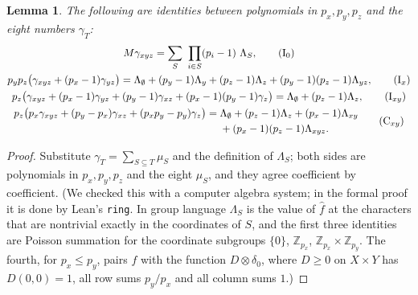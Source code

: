 \documentclass[11pt,a4paper]{amsart}
\newtheorem{lemma}[theorem]{Lemma}
\theoremstyle{definition}
\theoremstyle{remark}
\newcommand{\Z}{\mathbb{Z}}
\begin{document}
\begin{lemma}\label{lem:ident}
The following are identities between polynomials in $p_x,p_y,p_z$ and the eight numbers $\gamma_T$:
\begin{gather*}
 M\gamma_{xyz}=\sum_{S}\ \prod_{i\in S}(p_i-1)\ \Lambda_S, \tag{I$_0$}\\
 p_yp_z\bigl(\gamma_{xyz}+(p_x-1)\gamma_{yz}\bigr)=\Lambda_\emptyset+(p_y-1)\Lambda_y+(p_z-1)\Lambda_z
   +(p_y-1)(p_z-1)\Lambda_{yz}, \tag{I$_x$}\\
 p_z\bigl(\gamma_{xyz}+(p_x-1)\gamma_{yz}+(p_y-1)\gamma_{xz}+(p_x-1)(p_y-1)\gamma_{z}\bigr)
   =\Lambda_\emptyset+(p_z-1)\Lambda_z, \tag{I$_{xy}$}\\
 \begin{aligned}
 p_z\bigl(p_x\gamma_{xyz}+(p_y-p_x)\gamma_{xz}+(p_xp_y-p_y)\gamma_{z}\bigr)
   ={}&\Lambda_\emptyset+(p_z-1)\Lambda_z+(p_x-1)\Lambda_{xy}\\
   &{}+(p_x-1)(p_z-1)\Lambda_{xyz}.
 \end{aligned} \tag{C$_{xy}$}
\end{gather*}
\end{lemma}
\begin{proof}
Substitute $\gamma_T=\sum_{S\subseteq T}\mu_S$ and the definition of $\Lambda_S$; both sides are polynomials in
$p_x,p_y,p_z$ and the eight $\mu_S$, and they agree coefficient by coefficient. (We checked this with a computer
algebra system; in the formal proof it is done by Lean's \texttt{ring}. In group language $\Lambda_S$ is the
value of $\hat f$ at the characters that are nontrivial exactly in the coordinates of $S$, and the first three
identities are Poisson summation for the coordinate subgroups $\{0\}$, $\Z_{p_x}$, $\Z_{p_x}\times\Z_{p_y}$. The
fourth, for $p_x\le p_y$, pairs $f$ with the function $D\otimes\delta_0$, where $D\ge 0$ on $X\times Y$ has
$D(0,0)=1$, all row sums $p_y/p_x$ and all column sums $1$.)
\end{proof}
\end{document}
